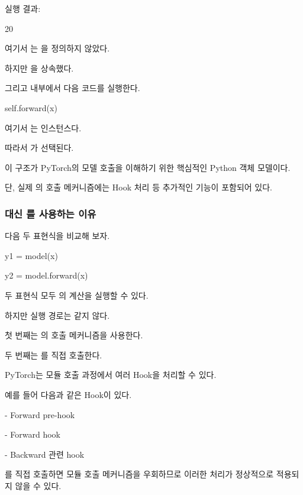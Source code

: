 실행 결과:

\begin{dhkzsh}
20
\end{dhkzsh}

여기서 는 을 정의하지 않았다.

하지만 을 상속했다.

그리고  내부에서 다음 코드를 실행한다.

\begin{dhkcode}
self.forward(x)
\end{dhkcode}

여기서 는  인스턴스다.

따라서 가 선택된다.

이 구조가 PyTorch의 모델 호출을 이해하기 위한 핵심적인 Python 객체 모델이다.

단, 실제 의 호출 메커니즘에는 Hook 처리 등 추가적인 기능이 포함되어 있다.

\subsubsection{ 대신 를 사용하는 이유}

다음 두 표현식을 비교해 보자.

\begin{dhkcode}
y1 = model(x)

y2 = model.forward(x)
\end{dhkcode}

두 표현식 모두 의 계산을 실행할 수 있다.

하지만 실행 경로는 같지 않다.

첫 번째는 의 호출 메커니즘을 사용한다.

두 번째는 를 직접 호출한다.

PyTorch는 모듈 호출 과정에서 여러 Hook을 처리할 수 있다.

예를 들어 다음과 같은 Hook이 있다.

\begin{dhksmry}
    - Forward pre-hook

    - Forward hook

    - Backward 관련 hook
\end{dhksmry}

를 직접 호출하면 모듈 호출 메커니즘을 우회하므로 이러한 처리가 정상적으로 적용되지 않을 수 있다.

